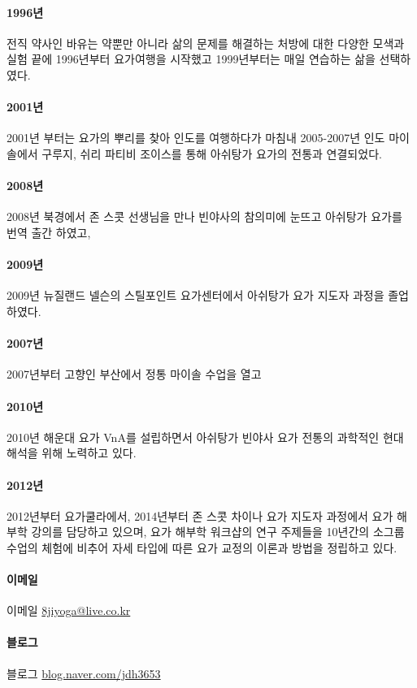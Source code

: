 \documentclass[12pt, a4paper, oneside]{book}
\begin{document}
\paragraph{1996년}
전직 약사인 바유는 약뿐만 아니라 삶의 문제를 해결하는 처방에 대한 다양한 모색과 실험 끝에 1996년부터 요가여행을 시작했고 1999년부터는 매일 연습하는 삶을 선택하였다.
\paragraph{2001년}
2001년 부터는 요가의 뿌리를 찾아 인도를 여행하다가 마침내 2005-2007년 인도 마이솔에서 구루지, 쉬리 파티비 조이스를 통해 아쉬탕가 요가의 전통과 연결되었다.
\paragraph{2008년}
2008년 북경에서 존 스콧 선생님을 만나 빈야사의 참의미에 눈뜨고 아쉬탕가 요가를 번역 출간 하였고, 
\paragraph{2009년}
2009년 뉴질랜드 넬슨의 스틸포인트 요가센터에서 아쉬탕가 요가 지도자 과정을 졸업하였다.
\paragraph{2007년}
2007년부터 고향인 부산에서 정통 마이솔 수업을 열고 
\paragraph{2010년}
2010년 해운대 요가 VnA를 설립하면서 아쉬탕가 빈야사 요가 전통의 과학적인 현대 해석을 위해 노력하고 있다.

\paragraph{2012년}
2012년부터 요가쿨라에서, 2014년부터 존 스콧 차이나 요가 지도자 과정에서 요가 해부학 강의를 담당하고 있으며, 
요가 해부학 워크샵의 연구 주제들을 10년간의 소그룹 수업의 체험에 비추어 자세 타입에 따른 요가 교정의 이론과 방법을 정립하고 있다.


\paragraph{이메일} 이메일	\href{8jiyoga@live.co.kr}{8jiyoga@live.co.kr}
\paragraph{블로그} 블로그 	\href{https://blog.naver.com/jdh3653} {blog.naver.com/jdh3653}
\end{document}
